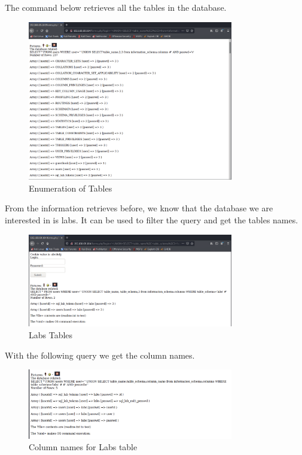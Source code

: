 The command below retrieves all the tables in the database.
\begin{figure}[H]
  \centering
  \includegraphics[width=0.8\textwidth]{figures/all_tables}
  \caption{Enumeration of Tables}
  \label{f:all_tables}
\end{figure}

From the information retrieves before, we know that the database we are interested in is labs.
It can be used to filter the query and get the tables names.
\begin{figure}[H]
  \centering
  \includegraphics[width=0.8\textwidth]{figures/labs-tables}
  \caption{Labs Tables}
  \label{f:labs-tables}
\end{figure}

With the following query we get the column names.
\begin{figure}[H]
  \centering
  \includegraphics[width=0.8\textwidth]{figures/column-names-labs-table}
  \caption{Column names for Labs table}
  \label{f:column-names-labs-table}
\end{figure}

